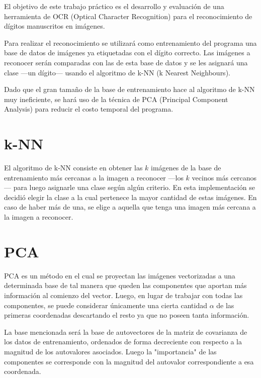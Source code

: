 El objetivo de este trabajo práctico es el desarrollo y evaluación de una herramienta de OCR (Optical Character Recognition) para el reconocimiento de dígitos manuscritos en imágenes.

Para realizar el reconocimiento se utilizará como entrenamiento del programa una base de datos de imágenes ya etiquetadas con el dígito correcto. Las imágenes a reconocer serán comparadas con las de esta base de datos y se les asignará una clase ---un dígito--- usando el algoritmo de k-NN (k Nearest Neighbours).

Dado que el gran tamaño de la base de entrenamiento hace al algoritmo de k-NN muy ineficiente, se hará uso de la técnica de PCA (Principal Component Analysis) para reducir el costo temporal del programa.

\section{k-NN}
El algoritmo de k-NN consiste en obtener las $k$ imágenes de la base de entrenamiento más cercanas a la imagen a reconocer ---los $k$ vecinos más cercanos--- para luego asignarle una clase según algún criterio. En esta implementación se decidió elegir la clase a la cual pertenece la mayor cantidad de estas imágenes. En caso de haber más de una, se elige a aquella que tenga una imagen más cercana a la imagen a reconocer.


\section{PCA}
PCA es un método en el cual se proyectan las imágenes vectorizadas a una determinada base de tal manera que queden las componentes que aportan más información al comienzo del vector. Luego, en lugar de trabajar con todas las componentes, se puede considerar únicamente una cierta cantidad $\alpha$ de las primeras coordenadas descartando el resto ya que no poseen tanta información.

La base mencionada será la base de autovectores de la matriz de covarianza de los datos de entrenamiento, ordenados de forma decreciente con respecto a la magnitud de los autovalores asociados. Luego la "importancia" de las componentes se corresponde con la magnitud del autovalor correspondiente a esa coordenada.